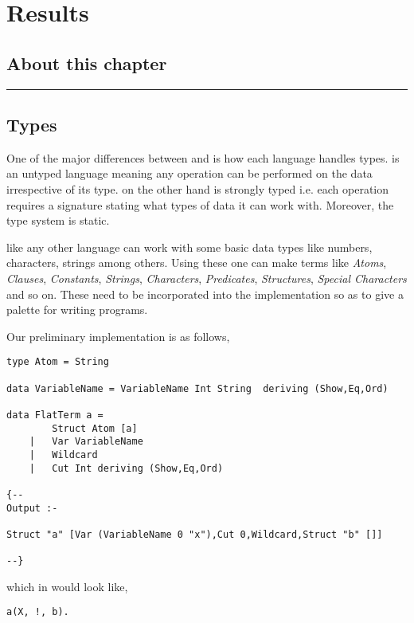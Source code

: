 \documentclass[thesis-solanki.tex]{subfiles}
\begin{document}
\chapter{Results}\label{sect:results}


\section{About this chapter}

\noindent\rule{\textwidth}{0.5pt}

\section{Types}


One of the major differences between  and  is how each language handles types.
 is an untyped language meaning any operation can be performed on the data irrespective of its
type.
 on the other hand is strongly typed i.e.
each operation requires a signature stating what types of data it can work with.
Moreover, the  type system is static.


 like any other language can work with some basic data types like numbers, characters, strings
among others.
Using these one can make terms like \textit{Atoms}, \textit{Clauses}, \textit{Constants}, \textit{Strings},
\textit{Characters}, \textit{Predicates}, \textit{Structures}, \textit{Special Characters} and so on.
These need to be incorporated into the implementation so as to give a palette for writing programs.

Our preliminary implementation is as follows,
\begin{verbatim}
type Atom = String

data VariableName = VariableName Int String  deriving (Show,Eq,Ord)

data FlatTerm a = 
		Struct Atom [a]
	| 	Var VariableName
	|	Wildcard
	|	Cut Int deriving (Show,Eq,Ord)

{--
Output :-

Struct "a" [Var (VariableName 0 "x"),Cut 0,Wildcard,Struct "b" []]

--}
\end{verbatim}
        
which in  would look like,

\begin{verbatim}
a(X, !, b).
\end{verbatim}
\end{document}
